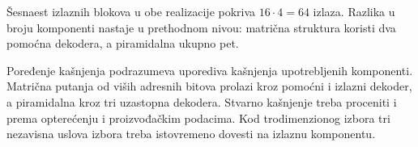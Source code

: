 Šesnaest izlaznih blokova u obe realizacije pokriva \(16\cdot4=64\) izlaza.
Razlika u broju komponenti nastaje u prethodnom nivou:
matrična struktura koristi dva pomoćna dekodera, a piramidalna ukupno pet.

Poređenje kašnjenja podrazumeva uporediva kašnjenja upotrebljenih komponenti.
Matrična putanja od viših adresnih bitova prolazi kroz pomoćni i izlazni dekoder,
a piramidalna kroz tri uzastopna dekodera.
Stvarno kašnjenje treba proceniti i prema opterećenju i proizvođačkim podacima.
Kod trodimenzionog izbora tri nezavisna uslova izbora treba istovremeno dovesti na izlaznu komponentu.
